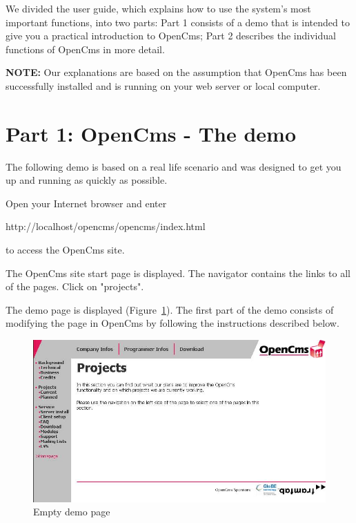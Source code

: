 We divided the user guide, which explains how to use the system's
most important functions, into two parts: Part 1 consists of a
demo that is intended to give you a practical introduction to
OpenCms; Part 2 describes the individual functions of OpenCms in
more detail.

\textbf{NOTE:} Our explanations are based on the assumption that
OpenCms has been successfully installed and is running on your web
server or local computer.

\section{Part 1: OpenCms - The demo}

The following demo is based on a real life scenario and was
designed to get you up and running as quickly as possible.

Open your Internet browser and enter

http://localhost/opencms/opencms/index.html

to access the OpenCms site.

The OpenCms site start page is displayed. The navigator contains
the links to all of the pages. Click on "projects".

The demo page is displayed (Figure~\ref{demopage01}). The first
part of the demo consists of modifying the page in OpenCms by
following the instructions described below.

\begin{figure}[hbt]
\begin{center}
\includegraphics[width=\sgw]
                   {pics/usermanual/demoPage01}
\caption[Empty demo page]
           {Empty demo page}
\label{demopage01}
\end{center}
\end{figure}

